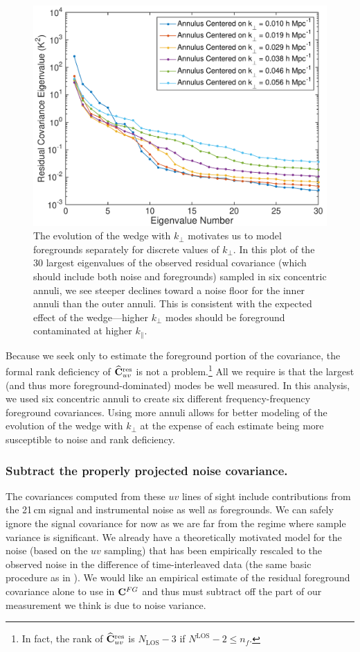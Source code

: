 \begin{figure}[]  
	\centering 
	\includegraphics[width=.48\textwidth]{chap4_empirical_covariance/wedge_eigenvalues.pdf}
	\caption[Plot of the 30 largest eigenvalues of the observed residual foreground covariance matrix.]{The evolution of the wedge with $k_\perp$ motivates us to model foregrounds separately for discrete values of $k_\perp$. In this plot of the 30 largest eigenvalues of the observed residual covariance (which should include both noise and foregrounds) sampled in six concentric annuli, we see steeper declines toward a noise floor for the inner annuli than the outer annuli. This is consistent with the expected effect of the wedge---higher $k_\perp$ modes should be foreground contaminated at higher $k_\|$.}
	\label{fig:wedge_eigenvalues}
\end{figure}
 
Because we seek only to estimate the foreground portion of the covariance, the formal rank deficiency of $\widehat{\mathbf{C}}^\text{res}_{uv}$ is not a problem.\footnote{In fact, the rank of $\widehat{\mathbf{C}}^\text{res}_{uv}$ is $N_\text{LOS} - 3$ if $N^\text{LOS}-2 \le n_f$.} All we require is that the largest (and thus more foreground-dominated) modes be well measured. In this analysis, we used six concentric annuli to create six different frequency-frequency foreground covariances. Using more annuli allows for better modeling of the evolution of the wedge with $k_\perp$ at the expense of each estimate being more susceptible to noise and rank deficiency. 


\subsubsection{Subtract the properly projected noise covariance.}
 
The covariances computed from these $uv$ lines of sight include contributions from the 21\,cm signal and instrumental noise as well as foregrounds. We can safely ignore the signal covariance for now as we are far from the regime where sample variance is significant. We already have a theoretically motivated model for the noise (based on the $uv$ sampling) that has been empirically rescaled to the observed noise in the difference of time-interleaved data (the same basic procedure as in \cite{X13}). We would like an empirical estimate of the residual foreground covariance alone to use in $\mathbf{C}^{FG}$ and thus must subtract off the part of our measurement we think is due to noise variance.

